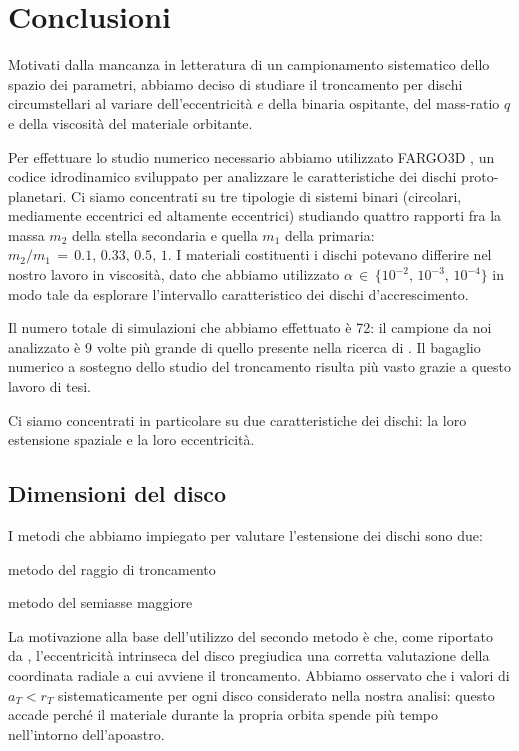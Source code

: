 \chapter{Conclusioni}

Motivati dalla mancanza in letteratura di un campionamento sistematico dello spazio dei parametri, abbiamo deciso di studiare il troncamento per dischi circumstellari al variare dell'eccentricità $e$ della binaria ospitante, del mass-ratio $q$ e della viscosità del materiale orbitante.

Per effettuare lo studio numerico necessario abbiamo utilizzato FARGO3D \parencite{Fargo3D}, un codice idrodinamico sviluppato per analizzare le caratteristiche dei dischi proto-planetari.
Ci siamo concentrati su tre tipologie di sistemi binari (circolari, mediamente eccentrici ed altamente eccentrici) studiando quattro rapporti fra la massa $m_2$ della stella secondaria e quella $m_1$ della primaria: $m_2/m_1\,=\,0.1,\,0.33,\,0.5,\,1$.
I materiali costituenti i dischi potevano differire nel nostro lavoro in viscosità, dato che abbiamo utilizzato $\alpha\,\in\,\{10^{-2},\, 10^{-3},\,10^{-4}\}$ in modo tale da esplorare l'intervallo caratteristico dei dischi d'accrescimento.

Il numero totale di simulazioni che abbiamo effettuato è 72: il campione da noi analizzato è 9 volte più grande di quello presente nella ricerca di \textcite{ArtymowiczLubow1994}. Il bagaglio numerico a sostegno dello studio del troncamento risulta più vasto grazie a questo lavoro di tesi.

Ci siamo concentrati in particolare su due caratteristiche dei dischi: la loro estensione spaziale e la loro eccentricità.

\section{Dimensioni del disco}

I metodi che abbiamo impiegato per valutare l'estensione dei dischi sono due:
\begin{list}{\textbf{-}}{\setlength{\itemsep}{0cm}}
    \item metodo del raggio di troncamento
    \item metodo del semiasse maggiore
\end{list}
La motivazione alla base dell'utilizzo del secondo metodo è che, come riportato da \textcite{ArtymowiczLubow1994}, l'eccentricità intrinseca del disco pregiudica una corretta valutazione della coordinata radiale a cui avviene il troncamento.
Abbiamo osservato che i valori di $a_T < r_T$ sistematicamente per ogni disco considerato nella nostra analisi: questo accade perché il materiale durante la propria orbita spende più tempo nell'intorno dell'apoastro.

